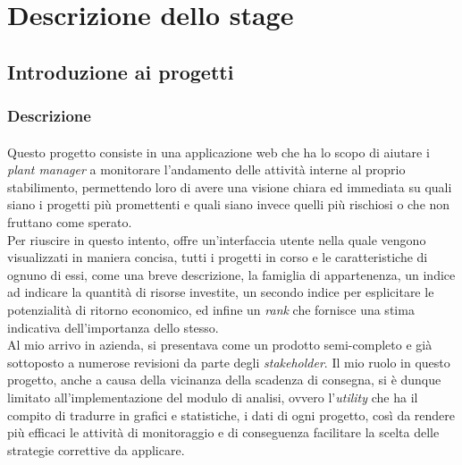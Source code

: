 \newpage
\chapter{Descrizione dello stage}
\label{cap:descrizione-stage}
\section{Introduzione ai progetti}
\subsection{Descrizione}
\subsubsection*{\DS}
Questo progetto consiste in una applicazione web che ha lo scopo di aiutare i \textit{plant manager} a monitorare l'andamento delle attività interne al proprio stabilimento, permettendo loro di avere una visione chiara ed immediata su quali siano i progetti più promettenti e quali siano invece quelli più rischiosi o che non fruttano come sperato. \\
Per riuscire in questo intento, \DS{} offre un'interfaccia utente nella quale vengono visualizzati in maniera concisa, tutti i progetti in corso e le caratteristiche di ognuno di essi, come una breve descrizione, la famiglia di appartenenza, un indice ad indicare la quantità di risorse investite, un secondo indice per esplicitare le potenzialità di ritorno economico, ed infine un \textit{rank} che  fornisce una stima indicativa dell'importanza dello stesso.\\
Al mio arrivo in azienda, \DS{} si presentava come un prodotto semi-completo e già sottoposto a numerose revisioni da parte degli \textit{stakeholder}. Il mio ruolo in questo progetto, anche a causa della vicinanza della scadenza di consegna, si è dunque limitato all'implementazione del modulo di analisi, ovvero l'\textit{utility} che ha il compito di tradurre in grafici e statistiche, i dati di ogni progetto, così da rendere più efficaci le attività di monitoraggio e di conseguenza facilitare la scelta delle strategie correttive da applicare.

